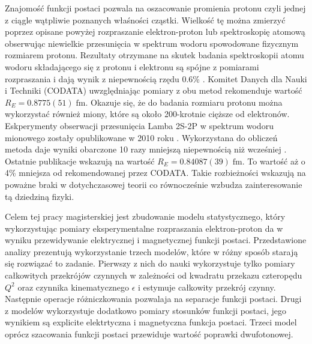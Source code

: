 \documentclass[11pt]{book}
\theoremstyle{definition}
\begin{document}
Znajomość funkcji postaci pozwala na oszacowanie promienia protonu czyli jednej z ciągle wątpliwie poznanych właśności cząstki. Wielkość tę można zmierzyć poprzez opisane powyżej rozpraszanie elektron-proton lub spektroskopię atomową obserwując niewielkie przesunięcia w spektrum wodoru spowodowane fizycznym rozmiarem protonu. Rezultaty otrzymane na skutek badania spektroskopii atomu wodoru składającego się z protonu i elektronu są spójne z pomiarami rozpraszania i dają wynik z niepewnością rzędu 0.6\% \cite{Carlson:2015jba}. Komitet Danych dla Nauki i Techniki (CODATA) uwzględniając pomiary z obu metod rekomenduje wartość \cite{2012RvMP...84.1527M}
$R_E = 0.8775(51) \; \text{fm}$. Okazuje się, że do badania rozmiaru protonu można wykorzystać również miony, które są około 200-krotnie cięższe od elektronów. Eskperymenty obserwacji przesunięcia Lamba 2S-2P w spektrum wodoru mionowego zostały opublikowane w 2010 roku \cite{2010Nature..Pohl}. Wykorzystana do obliczeń metoda daje wyniki obarczone 10 razy mniejszą niepewnością niż wcześniej \cite{Carlson:2015jba}. Ostatnie publikacje  \cite{Antognini417} wskazują na wartość $R_E = 0.84087(39) \; \text{fm}.$ To wartość aż o 4\% mniejsza od rekomendowanej przez CODATA. Takie rozbieżności wskazują na poważne braki w dotychczasowej teorii co równocześnie wzbudza zainteresowanie tą dziedziną fizyki.

Celem tej pracy magisterskiej jest zbudowanie modelu statystycznego, który wykorzystując pomiary eksperymentalne rozpraszania elektron-proton da w wyniku przewidywanie elektrycznej i magnetycznej funkcji postaci. Przedstawione analizy prezentują wykorzystanie trzech modelów, które w różny sposób starają się rozwiązać to zadanie. Pierwszy z nich do nauki wykorzystuje tylko pomiary całkowitych przekrójów czynnych w zależności od kwadratu przekazu czteropędu $Q^2$ oraz czynnika kinematycznego $\epsilon$ i estymuje całkowity przekrój czynny. Następnie operacje różniczkowania pozwalaja na separacje funkcji postaci. Drugi z modelów wykorzystuje dodatkowo pomiary stosunków funkcji postaci, jego wynikiem są explicite elektrtyczna i magnetyczna funkcja postaci. Trzeci model oprócz szacowania funkcji postaci przewiduje wartość poprawki dwufotonowej.
\end{document}
